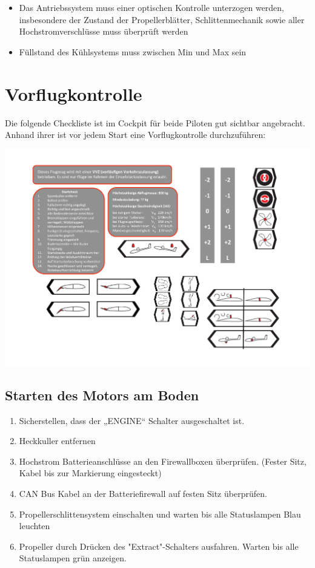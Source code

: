 \begin{itemize}
\item Das Antriebssystem muss einer optischen Kontrolle unterzogen werden, insbesondere der Zustand der Propellerblätter, Schlittenmechanik sowie aller Hochstromverschlüsse muss überprüft werden
\item  Füllstand des Kühlsystems muss zwischen Min und Max sein
\end{itemize}

\section{Vorflugkontrolle}
Die folgende Checkliste ist im Cockpit für beide Piloten gut sichtbar angebracht. Anhand ihrer ist vor jedem Start eine Vorflugkontrolle durchzuführen:
\begin{center}
\includegraphics[width=.45\textwidth]{bilder/startcheck.pdf}
\end{center}

\subsection{Starten des Motors am Boden}

\begin{enumerate}
\item Sicherstellen, dass der „ENGINE“ Schalter ausgeschaltet ist.
\item Heckkuller entfernen
\item Hochstrom Batterieanschlüsse an den Firewallboxen überprüfen. (Fester Sitz, Kabel bis zur Markierung eingesteckt)
\item CAN Bus Kabel an der Batteriefirewall auf festen Sitz überprüfen.
\item Propellerschlittensystem einschalten und warten bis alle Statuslampen Blau leuchten
\item Propeller durch Drücken des "Extract"-Schalters ausfahren. Warten bis alle Statuslampen grün anzeigen.
\end{enumerate}

